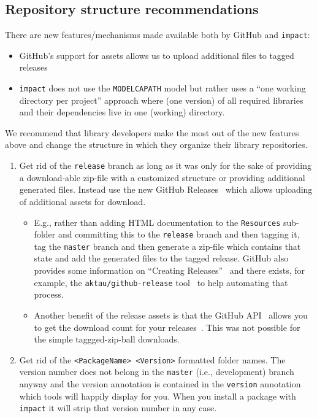 \documentclass[11pt,a4paper,twocolumn]{article}
\newcommand{\code}[1]{\texttt{#1}} %
\begin{document}
\subsection{Repository structure recommendations}
There are new features/mechanisms made available both by GitHub and
\code{impact}:
\begin{itemize}
\item GitHub's support for assets \parencite{gh-assets} allows us to
  upload additional files to tagged releases
\item \code{impact} does not use the \texttt{MODELCAPATH} model but
  rather uses a ``one working directory per project'' approach where
  (one version) of all required libraries and their dependencies live
  in one (working) directory.
\end{itemize}

We recommend that library developers make the most out of the new
features above and change the structure in which they organize their
library repositories.
\begin{enumerate}
\item Get rid of the \texttt{release} branch as long as it was only
  for the sake of providing a download-able zip-file with a customized
  structure or providing additional generated files.
  Instead use the new GitHub Releases~\parencite{gh-assets} which
  allows uploading of additional assets for download.
  \begin{itemize}
  \item E.g., rather than adding HTML documentation to the
    \texttt{Resources} sub-folder and committing this to the
    \texttt{release} branch and then tagging it, tag the
    \texttt{master} branch and then generate a zip-file which contains
    that state and add the generated files to the tagged release.
    GitHub also provides some information on ``Creating
    Releases''~\parencite{gh-releases} and there exists, for example,
    the \texttt{aktau/github-release}
    tool~\parencite{aktau-github-release} to help automating that
    process.
  \item Another benefit of the release assets is that the GitHub
    API~\parencite{gh-api} allows you to get the download count for
    your releases~\parencite{gh-dl-count}.  This was not possible for
    the simple taggged-zip-ball downloads.
  \end{itemize}
\item Get rid of the \texttt{<PackageName> <Version>} formatted folder
  names. The version number does not belong in the \texttt{master}
  (i.e., development) branch anyway and the version annotation is
  contained in the \texttt{version} annotation which tools will
  happily display for you. When you install a package with
  \code{impact} it will strip that version number in any case.
\end{enumerate}
\end{document}

